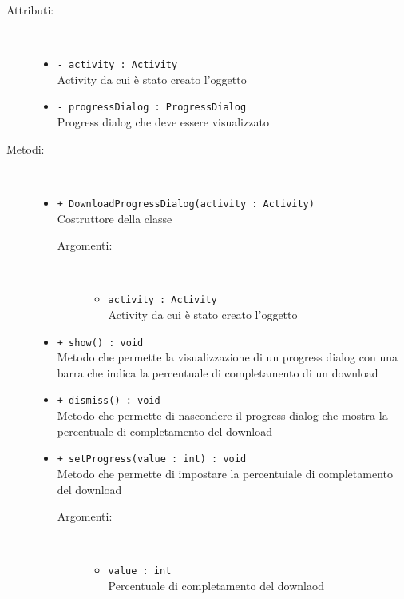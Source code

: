 \documentclass[../Tesi.tex]{subfiles}
\begin{document}
		\begin{description}
			\item[Attributi:] \
			\begin{itemize}
				\item \texttt{- activity : Activity}\\
				Activity da cui è stato creato l'oggetto

				\item \texttt{- progressDialog : ProgressDialog}\\
				Progress dialog che deve essere visualizzato 
			\end{itemize}

			\item[Metodi:] \
			\begin{itemize}
				\item \texttt{+ DownloadProgressDialog(activity : Activity)}\\
				Costruttore della classe 
				\begin{description}
					\item[Argomenti:] \
					\begin{itemize}
						\item \texttt{activity : Activity}\\
						Activity da cui è stato creato l'oggetto
					\end{itemize}
				\end{description}

				\item \texttt{+ show() : void}\\
				Metodo che permette la visualizzazione di un progress dialog con una barra che indica la percentuale di completamento di un download

				\item \texttt{+ dismiss() : void}\\
				Metodo che permette di nascondere il progress dialog che mostra la percentuale di completamento del download
				
				\item \texttt{+ setProgress(value : int) : void}\\
				Metodo che permette di impostare la percentuiale di completamento del download
				\begin{description}
					\item[Argomenti:] \
					\begin{itemize}
						\item \texttt{value : int}\\
						Percentuale di completamento del downlaod
					\end{itemize}
				\end{description}


\end{itemize}
\end{description}
\end{document}
